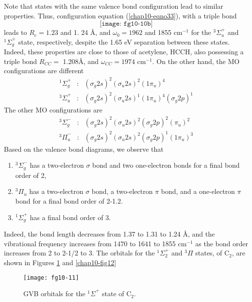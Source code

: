Note that states with the same valence bond configuration lead to
similar properties.  Thus, configuration equation
(\ref{chap10-eqno33}), with a triple bond
\begin{equation}
\texttt{[image: fg10-10b]}
\end{equation}
leads to $R_e = 1.23$ and 1. 24 \AA, and $\omega_0 = 1962$ and 1855 
cm$^{-1}$ for the ${^3\Sigma}^+_u$ and ${^1\Sigma}^+_g$ state, 
respectively, despite the 1.65 eV separation between these
states.  Indeed, these properties are close to those of acetylene, 
HCCH, also possessing a triple bond $R_{CC} =$ 1.208\AA, 
and $\omega_{CC} = 1974$ cm$^{-1}$.  On the other hand, the MO
configurations are different 
\begin{eqnarray}
{^1\Sigma}^+_g &:&\left( \sigma_g 2s \right)^2 \left( \sigma_u 2s 
\right)^2 \left( 1 \pi_u \right)^4\\
{^3\Sigma}^+_u &:& \left( \sigma_g 2s \right)^2 \left( \sigma_u 2s 
\right)^1 \left( 1 \pi_u \right)^4 \left( \sigma_g 2p \right)^1
\label{chap10-eqno34}
\end{eqnarray}
The other MO configurations are
\begin{eqnarray}
{^3\Sigma}^-_g &:& \left( \sigma_g 2s \right)^2 \left( \sigma_u 2s 
\right)^2 \left( \sigma_g 2p \right)^2 \left( \pi_u \right)^2\\
{^3\Pi}^-_u &:& \left( \sigma_g 2s \right)^2 \left( \sigma_u 2s 
\right)^2 \left( \sigma_g 2p \right)^1 \left( 1 \pi_u \right)^3
\end{eqnarray}
Based on the valence bond diagrams, we observe that
\begin{enumerate}
\item ${^3\Sigma}^-_g$ has a two-electron $\sigma$ bond and
two one-electron bonds for a final bond order of 2,
\item ${^3\Pi}_u$ has a two-electron $\sigma$ bond, a two-electron
$\pi$ bond,  and a one-electron $\pi$ bond for a final
bond order of 2-1.2. 
\item ${^1\Sigma}^+_g$ has a final bond 
order of 3. 
\end{enumerate}
Indeed, the bond length decreases from 1.37 to 1.31 to 1.24 \AA, and
the vibrational frequency increases from 1470 to 1641 to 1855
cm$^{-1}$ as the bond order increases from 2 to 2-1/2 to 3.  The
orbitals for the ${^1\Sigma}^+_2$ and ${^3\Pi}$ states, of C$_2$, are
shown in Figures \ref{chap10-fig11} and \ref{chap10-fig12}

\begin{figure}
\texttt{[image: fg10-11]}
\caption{GVB orbitals for the ${^1\Sigma}^+$ state of C$_2$.}
\label{chap10-fig11}
\end{figure}


